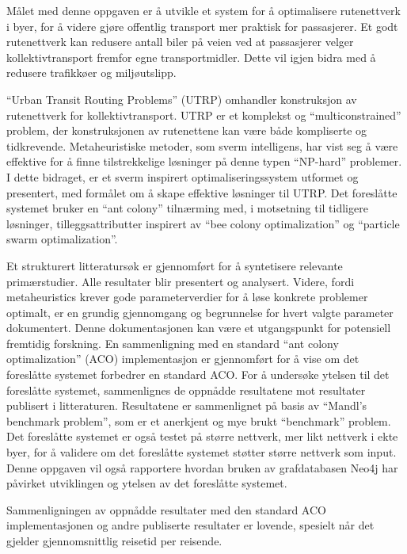 Målet med denne oppgaven er å utvikle et system for å optimalisere rutenettverk i byer, for å videre gjøre offentlig transport mer praktisk for passasjerer. Et godt rutenettverk kan redusere antall biler på veien ved at passasjerer velger kollektivtransport fremfor egne transportmidler. Dette vil igjen bidra med å redusere trafikkøer og miljøutslipp.

``Urban Transit Routing Problems'' (UTRP) omhandler konstruksjon av rutenettverk for kollektivtransport. UTRP er et komplekst og ``multiconstrained'' problem, der konstruksjonen av rutenettene kan være både kompliserte og tidkrevende. Metaheuristiske metoder, som sverm intelligens, har vist seg å være effektive for å finne tilstrekkelige løsninger på denne typen ``NP-hard'' problemer. I dette bidraget, er et sverm inspirert optimaliseringssystem utformet og presentert, med formålet om å skape effektive løsninger til UTRP. Det foreslåtte systemet bruker en ``ant colony'' tilnærming med, i motsetning til tidligere løsninger, tilleggsattributter inspirert av ``bee colony optimalization'' og ``particle swarm optimalization''.

Et strukturert litteratursøk er gjennomført for å syntetisere relevante primærstudier. Alle resultater blir presentert og analysert. Videre, fordi metaheuristics krever gode parameterverdier for å løse konkrete problemer optimalt, er en grundig gjennomgang og begrunnelse for hvert valgte parameter dokumentert. Denne dokumentasjonen kan være et utgangspunkt for potensiell fremtidig forskning. En sammenligning med en standard ``ant colony optimalization'' (ACO) implementasjon er gjennomført for å vise om det foreslåtte systemet forbedrer en standard ACO. For å undersøke ytelsen til det foreslåtte systemet, sammenlignes de oppnådde resultatene mot resultater publisert i litteraturen. Resultatene er sammenlignet på basis av ``Mandl's benchmark problem'', som er et anerkjent og mye brukt ``benchmark'' problem. Det foreslåtte systemet er også testet på større nettverk, mer likt nettverk i ekte byer, for å validere om det foreslåtte systemet støtter større nettverk som input. Denne oppgaven vil også rapportere hvordan bruken av grafdatabasen Neo4j har påvirket utviklingen og ytelsen av det foreslåtte systemet.

Sammenligningen av oppnådde resultater med den standard ACO implementasjonen og andre publiserte resultater er lovende, spesielt når det gjelder gjennomsnittlig reisetid per reisende.
